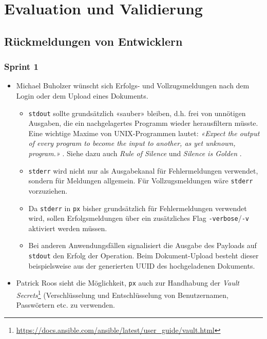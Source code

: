 \section{Evaluation und Validierung}

\subsection{Rückmeldungen von Entwicklern}

\subsubsection{Sprint 1}

\begin{itemize}
    \item Michael Buholzer wünscht sich Erfolgs- und Vollzugsmeldungen nach dem Login oder dem Upload eines Dokuments.
    \begin{itemize}
        \item \texttt{stdout} sollte grundsätzlich «sauber» bleiben, d.h. frei von unnötigen Ausgaben, die ein nachgelagertes Programm wieder herausfiltern müsste. Eine wichtige Maxime von UNIX-Programmen lautet: \textit{«Expect the output of every program to become the input to another, as yet unknown, program.»} \cite[p. 3]{unixtimesharing}. Siehe dazu auch \textit{Rule of Silence} \cite[p. 20]{unixart} und \textit{Silence is Golden} \cite[p. 111]{unixphil}.
        \item \texttt{stderr} wird nicht nur als Ausgabekanal für Fehlermeldungen verwendet, sondern für Meldungen allgemein. Für Vollzugsmeldungen wäre \texttt{stderr} vorzuziehen.
        \item Da \texttt{stderr} in \texttt{px} bisher grundsätzlich für Fehlermeldungen verwendet wird, sollen Erfolgsmeldungen über ein zusätzliches Flag \texttt{-verbose}/\texttt{-v} aktiviert werden müssen.
        \item Bei anderen Anwendungsfällen signalisiert die Ausgabe des Payloads auf \texttt{stdout} den Erfolg der Operation. Beim Dokument-Upload besteht dieser beispielsweise aus der generierten UUID des hochgeladenen Dokuments.
    \end{itemize}
\item Patrick Roos sieht die Möglichkeit, \texttt{px} auch zur Handhabung der \textit{Vault Secrets}\footnote{\url{https://docs.ansible.com/ansible/latest/user_guide/vault.html}} (Verschlüsselung und Entschlüsselung von Benutzernamen, Passwörtern etc. zu verwenden.
    \begin{itemize}

\end{itemize}
\end{itemize}
